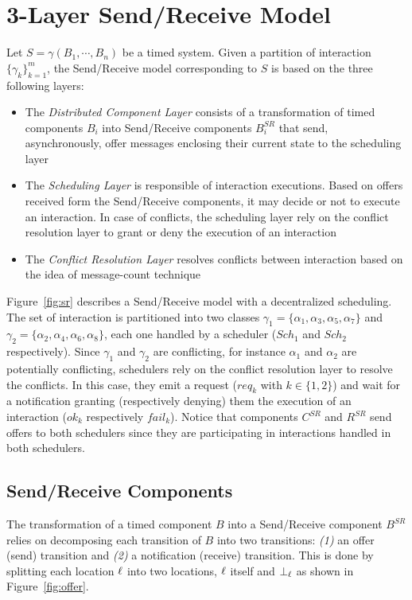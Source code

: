 \section{3-Layer Send/Receive Model}
Let $S=\gamma(B_1,\cdots,B_n)$ be a timed system. Given a partition of interaction
$\{\gamma_k\}^m_{k=1}$, the Send/Receive model corresponding to $S$ is based on the three
following layers:
\begin{itemize}
  \item The \emph{Distributed Component Layer} consists of a transformation of timed components
    $B_i$ into Send/Receive components $B_i^{SR}$ that send, asynchronously, offer messages 
    enclosing their current state to the scheduling layer 
  \item The \emph{Scheduling Layer} is responsible of interaction executions. Based on offers 
    received form the Send/Receive components, it may decide or not to execute an interaction.
    In case of conflicts, the scheduling layer rely on the conflict resolution layer to grant
    or deny the execution of an interaction
  \item The \emph{Conflict Resolution Layer} resolves conflicts between interaction based on
    the idea of message-count technique
\end{itemize}


\begin{example}
  Figure~\ref{fig:sr} describes a Send/Receive model with a decentralized scheduling. 
  The set of interaction is partitioned into two classes 
  $\gamma_1=\{\alpha_1,\alpha_3,\alpha_5,\alpha_7\}$ and
  $\gamma_2=\{\alpha_2,\alpha_4,\alpha_6,\alpha_8\}$, each one handled by a scheduler ($Sch_1$
  and $Sch_2$ respectively). Since $\gamma_1$ and $\gamma_2$ are conflicting, for instance
  $\alpha_1$ and $\alpha_2$ are potentially conflicting, schedulers rely on the conflict
  resolution layer to resolve the conflicts. In this case, they emit a request ($req_k$ with
  $k\in\{1,2\}$) and wait for a notification granting (respectively denying) them the execution
  of an interaction ($ok_k$ respectively $fail_k$).
  Notice that components $C^{SR}$ and $R^{SR}$ send offers to both schedulers since
  they are participating in interactions handled in both schedulers.
\end{example}
\subsection{Send/Receive Components}
The transformation of a timed component $B$ into a Send/Receive component $B^{SR}$ relies 
on decomposing each transition of $B$ into two transitions: \emph{(1)} an offer (send)
transition and \emph{(2)} a notification (receive) transition. This is done by splitting
each location $\ell$ into two locations, $\ell$ itself and $\perp_{\ell}$ as shown in 
Figure~\ref{fig:offer}.

